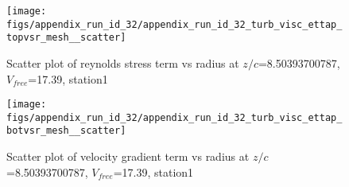 \begin{figure}[H]
\centering
\texttt{[image: figs/appendix\_run\_id\_32/appendix\_run\_id\_32\_turb\_visc\_ettap\_topvsr\_mesh\_\_scatter]}
\caption{Scatter plot of reynolds stress term vs radius at $z/c$=8.50393700787, $V_{free}$=17.39, station1}
\label{fig:appendix_run_id_32_turb_visc_ettap_topvsr_mesh__scatter}
\end{figure}


\begin{figure}[H]
\centering
\texttt{[image: figs/appendix\_run\_id\_32/appendix\_run\_id\_32\_turb\_visc\_ettap\_botvsr\_mesh\_\_scatter]}
\caption{Scatter plot of velocity gradient term vs radius at $z/c$=8.50393700787, $V_{free}$=17.39, station1}
\label{fig:appendix_run_id_32_turb_visc_ettap_botvsr_mesh__scatter}
\end{figure}


